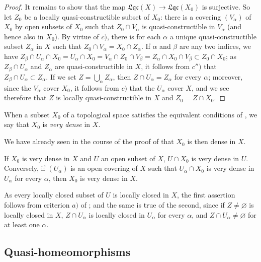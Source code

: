 \begin{proof}
It remains to show that the map $\mathfrak{Lqc}(X)\to\mathfrak{Lqc}(X_0)$ is surjective.
So let $Z_0$ be a locally quasi-constructible subset of $X_0$: there is a covering $(V_\alpha)$ of $X_0$ by open subsets of $X_0$ such that $Z_0\cap V_\alpha$ is quasi-constructible in $V_\alpha$ (and
hence also in $X_0$).
By virtue of $c)$, there is for each $\alpha$ a unique quasi-constructible subset $Z_\alpha$ in $X$ such that $Z_0\cap V_\alpha=X_0\cap Z_\alpha$.
If $\alpha$ and $\beta$ are any two indices, we have $Z_\beta\cap U_\alpha\cap X_0=U_\alpha\cap X_0=V_\alpha\cap Z_0\cap V_\beta=Z_\alpha\cap X_0\cap V_\beta\subset Z_0\cap X_0$; as $Z_\beta\cap U_\alpha$ and $Z_\alpha$ are quasi-constructible in $X$, it follows from $c'')$ that $Z_\beta\cap U_\alpha\subset Z_\alpha$.
If we set $Z=\bigcup_\alpha Z_\alpha$, then $Z\cap U_\alpha=Z_\alpha$ for every $\alpha$; moreover, since the $V_\alpha$ cover $X_0$, it follows from $c)$ that the $U_\alpha$ cover $X$, and we see therefore that $Z$ is locally quasi-constructible in $X$ and $Z_0=Z\cap X_0$.
\end{proof}

\begin{definition}[10.1.3]
\label{IV.10.1.3}
When a subset $X_0$ of a topological space satisfies the equivalent conditions of , we say that $X_0$ is \emph{very dense} in $X$.
\end{definition}

We have already seen in the course of the proof of  that $X_0$ is then dense in $X$.

\begin{corollary}[10.1.4]
\label{IV.10.1.4}
If $X_0$ is very dense in $X$ and $U$ an open subset of $X$, $U\cap X_0$ is very dense in $U$.
Conversely, if $(U_\alpha)$ is an open covering of $X$ such that $U_\alpha\cap X_0$ is very dense in $U_\alpha$ for every $\alpha$, then $X_0$ is very dense in $X$.
\end{corollary}

As every locally closed subset of $U$ is locally closed in $X$, the first assertion follows from criterion $a)$ of ; and the same is true of the second, since if $Z\neq\varnothing$ is locally closed in $X$, $Z\cap U_\alpha$ is locally closed in $U_\alpha$ for every $\alpha$, and $Z\cap U_\alpha\neq\varnothing$ for at least one $\alpha$.

\subsection{Quasi-homeomorphisms}
\label{subsection:IV.10.2}


